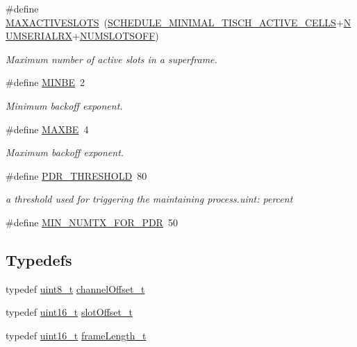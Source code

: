 \begin{DoxyCompactItemize}
\item 
\#define \hyperlink{group___schedule_ga5b6f09fe180237288683a64602eb5a85}{M\+A\+X\+A\+C\+T\+I\+V\+E\+S\+L\+O\+TS}~(\hyperlink{group___schedule_ga299d7e29eb70888b68ace83fd3f1a8df}{S\+C\+H\+E\+D\+U\+L\+E\+\_\+\+M\+I\+N\+I\+M\+A\+L\+\_\+T\+I\+S\+C\+H\+\_\+\+A\+C\+T\+I\+V\+E\+\_\+\+C\+E\+L\+LS}+\hyperlink{group___schedule_ga5206eabfac75eeed6f5066fb6d00f7c3}{N\+U\+M\+S\+E\+R\+I\+A\+L\+RX}+\hyperlink{group___schedule_ga9fd457940c2d1313fb347b5fd32d2105}{N\+U\+M\+S\+L\+O\+T\+S\+O\+FF})
\begin{DoxyCompactList}\small\item\em Maximum number of active slots in a superframe. \end{DoxyCompactList}\item 
\#define \hyperlink{group___schedule_ga731698f6cbe05cc416f1116762b2dc49}{M\+I\+N\+BE}~2
\begin{DoxyCompactList}\small\item\em Minimum backoff exponent. \end{DoxyCompactList}\item 
\#define \hyperlink{group___schedule_ga484b7be00a72295108c945848f750943}{M\+A\+X\+BE}~4
\begin{DoxyCompactList}\small\item\em Maximum backoff exponent. \end{DoxyCompactList}\item 
\#define \hyperlink{group___schedule_ga120d77f8a5101329b471874495b73942}{P\+D\+R\+\_\+\+T\+H\+R\+E\+S\+H\+O\+LD}~80
\begin{DoxyCompactList}\small\item\em a threshold used for triggering the maintaining process.\+uint\+: percent \end{DoxyCompactList}\item 
\#define \hyperlink{group___schedule_ga9f09f2107f559401598f179a3a8cabe6}{M\+I\+N\+\_\+\+N\+U\+M\+T\+X\+\_\+\+F\+O\+R\+\_\+\+P\+DR}~50
\end{DoxyCompactItemize}
\subsection*{Typedefs}
\begin{DoxyCompactItemize}
\item 
typedef \hyperlink{_p_e___types_8h_aba7bc1797add20fe3efdf37ced1182c5}{uint8\+\_\+t} \hyperlink{group___schedule_gab53645758fe83985f0b35af7c5c2115e}{channel\+Offset\+\_\+t}
\item 
typedef \hyperlink{_p_e___types_8h_a1f1825b69244eb3ad2c7165ddc99c956}{uint16\+\_\+t} \hyperlink{group___schedule_ga30a663860a70d8c9db2c3a8e66f544fc}{slot\+Offset\+\_\+t}
\item 
typedef \hyperlink{_p_e___types_8h_a1f1825b69244eb3ad2c7165ddc99c956}{uint16\+\_\+t} \hyperlink{group___schedule_gab960413860c0b01b38ece025b0ee534d}{frame\+Length\+\_\+t}
\end{DoxyCompactItemize}

